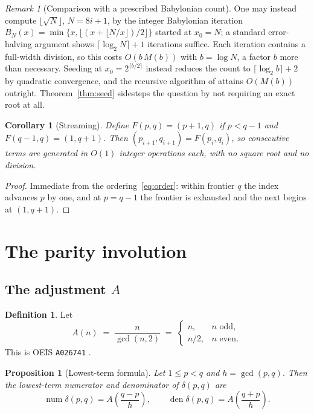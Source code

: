 \documentclass[11pt,a4paper]{article}
\theoremstyle{plain}
\newtheorem{proposition}[theorem]{Proposition}
\newtheorem{corollary}[theorem]{Corollary}
\theoremstyle{definition}
\newtheorem{definition}[theorem]{Definition}
\theoremstyle{remark}
\newtheorem{remark}[theorem]{Remark}
\begin{document}
\begin{remark}[Comparison with a prescribed Babylonian count]
One may instead compute $\lfloor \sqrt{N} \rfloor$, $N = 8i+1$, by the integer
Babylonian iteration $B_N(x) = \min\{x, \lfloor (x + \lfloor N/x \rfloor)/2\rfloor\}$
started at $x_0 = N$; a standard error-halving argument shows
$\lceil \log_2 N\rceil + 1$ iterations suffice. Each iteration contains a
full-width division, so this costs $O(b\,M(b))$ with $b = \log N$, a factor $b$
more than necessary. Seeding at $x_0 = 2^{\lceil b/2\rceil}$ instead reduces the
count to $\lceil \log_2 b \rceil + 2$ by quadratic convergence, and the recursive
algorithm of \cite[Alg.~1.12]{BrentZimmermann2021} attains $O(M(b))$ outright.
Theorem~\ref{thm:seed} sidesteps the question by not requiring an exact root at
all.
\end{remark}

\begin{corollary}[Streaming]\label{cor:stream}
Define $F(p,q) = (p+1, q)$ if $p < q-1$ and $F(q-1,q) = (1, q+1)$. Then
$(p_{i+1}, q_{i+1}) = F(p_i, q_i)$, so consecutive terms are generated in $O(1)$
integer operations each, with no square root and no division.
\end{corollary}

\begin{proof}
Immediate from the ordering~\eqref{eq:order}: within frontier $q$ the index
advances $p$ by one, and at $p = q-1$ the frontier is exhausted and the next
begins at $(1,q+1)$.
\end{proof}

\section{The parity involution}
\label{sec:involution}

\subsection{The adjustment \texorpdfstring{$A$}{A}}

\begin{definition}\label{def:A}
Let
\[
  A(n) \;=\; \frac{n}{\gcd(n,2)} \;=\;
  \begin{cases} n, & n \text{ odd},\\ n/2, & n \text{ even}.\end{cases}
\]
This is OEIS \texttt{A026741} \cite{OEIS_A026741}.
\end{definition}

\begin{proposition}[Lowest-term formula]\label{prop:lowest}
Let $1 \le p < q$ and $h = \gcd(p,q)$. Then the lowest-term numerator and
denominator of $\delta(p,q)$ are
\begin{equation}\label{eq:lowest}
  \operatorname{num} \delta(p,q) = A\!\left(\frac{q-p}{h}\right), \qquad
  \operatorname{den} \delta(p,q) = A\!\left(\frac{q+p}{h}\right).
\end{equation}
\end{proposition}
\end{document}

